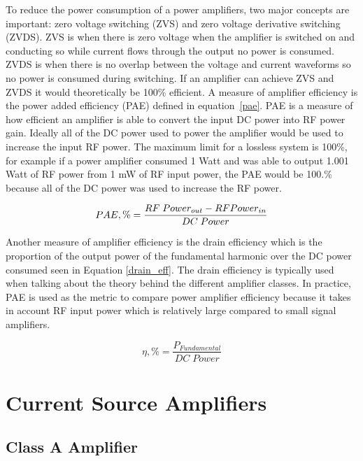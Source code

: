 To reduce the power consumption of a power amplifiers, two major concepts are important: zero voltage switching (ZVS) and zero voltage derivative switching (ZVDS). ZVS is when there is zero voltage when the amplifier is switched on and conducting so while current flows through the output no power is consumed. ZVDS is when there is no overlap between the voltage and current waveforms so no power is consumed during switching. If an amplifier can achieve ZVS and ZVDS it would theoretically be 100\% efficient. A measure of amplifier efficiency is the power added efficiency (PAE) defined in equation~\ref{pae}. PAE is a measure of how efficient an amplifier is able to convert the input DC power into RF power gain. Ideally all of the DC power used to power the amplifier would be used to increase the input RF power. The maximum limit for a lossless system is 100\%, for example if a power amplifier consumed 1 Watt and was able to output 1.001 Watt of RF power from 1 mW of RF input power, the PAE would be 100.\% because all of the DC power was used to increase the RF power.

\begin{equation}\label{pae}
  PAE,\% = \frac{RF\;Power_{out} - RF\\Power_{in}}{DC\;Power}
\end{equation}

Another measure of amplifier efficiency is the drain efficiency which is the proportion of the output power of the fundamental harmonic over the DC power consumed seen in Equation \ref{drain_eff}. The drain efficiency is typically used when talking about the theory behind the different amplifier classes. In practice, PAE is used as the metric to compare power amplifier efficiency because it takes in account RF input power which is relatively large compared to small signal amplifiers.

\begin{equation}\label{drain_eff}
  \eta, \% = \frac{P_{Fundamental}}{DC\;Power}
\end{equation}

\section{Current Source Amplifiers}

\subsection{Class A Amplifier}


